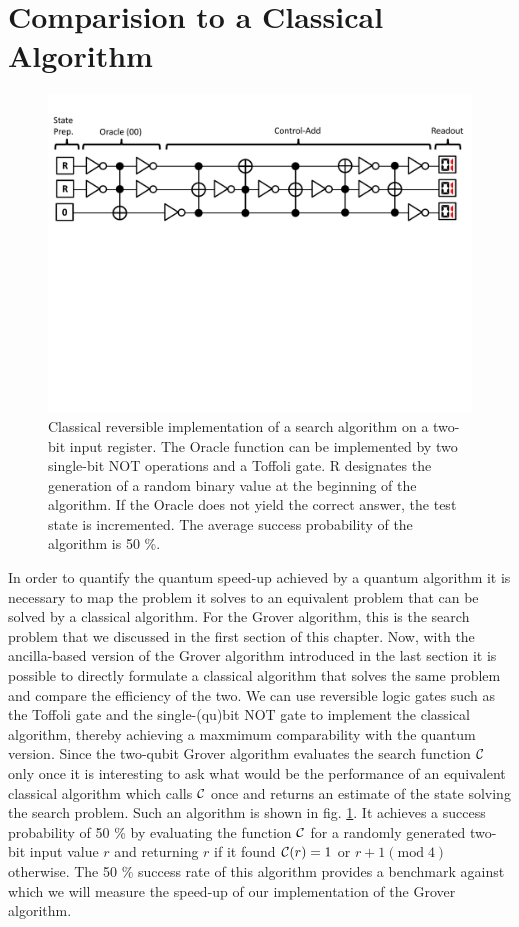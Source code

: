 \section{Comparision to a Classical Algorithm}

\begin{figure}[ht!]
	\centering
		\includegraphics[width=1.0\textwidth]{"./material/papers/grover/classical_reversible_algorithm"}
	\caption{Classical reversible implementation of a search algorithm on a two-bit input register. The Oracle function can be implemented by two single-bit NOT operations and a Toffoli gate. R designates the generation of a random binary value at the beginning of the algorithm. If the Oracle does not yield the correct answer, the test state is incremented. The average success probability of the algorithm is 50 \%.}
	\label{fig:GroverClassicalReversibleAlgorithm}
\end{figure}

In order to quantify the quantum speed-up achieved by a quantum algorithm it is necessary to map the problem it solves to an equivalent problem that can be solved by a classical algorithm. For the Grover algorithm, this is the search problem that we discussed in the first section of this chapter. Now, with the ancilla-based version of the Grover algorithm introduced in the last section it is possible to directly formulate a classical algorithm that solves the same problem and compare the efficiency of the two. We can use reversible logic gates such as the Toffoli gate and the single-(qu)bit NOT gate to implement the classical algorithm, thereby achieving a maxmimum comparability with the quantum version. Since the two-qubit Grover algorithm evaluates the search function $\Or$ only once it is interesting to ask what would be the performance of an equivalent classical algorithm which calls $\Or$ once and returns an estimate of the state solving the search problem. Such an algorithm is shown in fig. \ref{fig:GroverClassicalReversibleAlgorithm}. It achieves a success probability of 50 \% by evaluating the function $\Or$ for a randomly generated two-bit input value $r$ and returning $r$ if it found $\Or(r)=1$ or $r+1(\mathrm{mod}\;4)$ otherwise. The 50 \% success rate of this algorithm provides a benchmark against which we will measure the speed-up of our implementation of the Grover algorithm.



